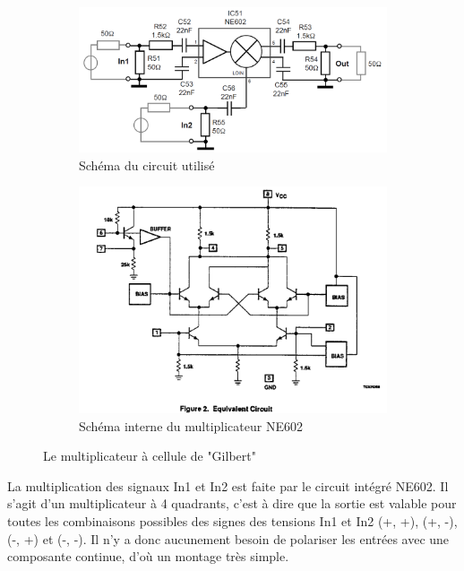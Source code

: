 \documentclass{article}
\begin{document}
\begin{figure}[h]
	\centering
	\begin{subfigure}[b]{0.6\textwidth}
		\centering
		\includegraphics[width=\textwidth]{shema_melangeur_gilbert}
		\caption{Schéma du circuit utilisé}
		\label{fig:schema_melangeur_gilbert}
	\end{subfigure}
	\hfill
	\begin{subfigure}[b]{0.35\textwidth}
		\centering
		\includegraphics[width=\textwidth]{shema_interne_ne602}
		\caption{Schéma interne du multiplicateur NE602}
		\label{fig:schema_melangeur_gilbert_interne}
	\end{subfigure}
	\caption{Le multiplicateur à cellule de "Gilbert"}
\end{figure}

La multiplication des signaux In1 et In2 est faite par le circuit intégré NE602.
Il s'agit d'un multiplicateur à 4 quadrants, c'est à dire que la sortie est valable pour toutes les combinaisons possibles des signes des tensions In1 et In2 (+, +), (+, -), (-, +) et (-, -).
Il n'y a donc aucunement besoin de polariser les entrées avec une composante continue, d'où un montage très simple.
\end{document}
